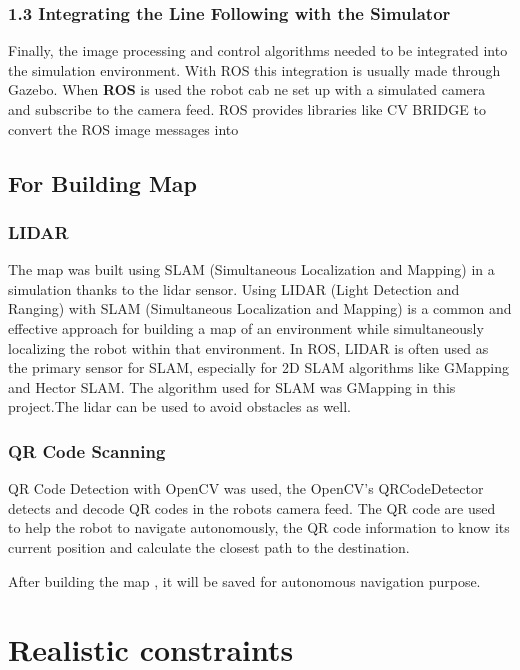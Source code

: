 \documentclass[../../main]{subfiles}
\begin{document}
    \subsection{1.3 Integrating the Line Following with the Simulator}
    
    Finally, the image processing and control algorithms needed to be
    integrated into the simulation environment. With ROS this integration is
    usually made through Gazebo. When \textbf{ROS} is used the robot cab ne
    set up with a simulated camera and subscribe to the camera feed. ROS
    provides libraries like CV BRIDGE to convert the ROS image messages into
    
    \section{For Building Map}
    
    \subsection{LIDAR}
    
    The map was built using SLAM (Simultaneous Localization and Mapping) in
    a simulation thanks to the lidar sensor. Using LIDAR (Light Detection
    and Ranging) with SLAM (Simultaneous Localization and Mapping) is a
    common and effective approach for building a map of an environment while
    simultaneously localizing the robot within that environment. In ROS,
    LIDAR is often used as the primary sensor for SLAM, especially for 2D
    SLAM algorithms like GMapping and Hector SLAM. The algorithm used for
    SLAM was GMapping in this project.The lidar can be used to avoid
    obstacles as well.
    
    \subsection{QR Code Scanning}
    
    QR Code Detection with OpenCV was used, the OpenCV's QRCodeDetector
    detects and decode QR codes in the robot\textquotesingle s camera feed.
    The QR code are used to help the robot to navigate autonomously, the QR
    code information to know its current position and calculate the closest
    path to the destination.
    
    After building the map , it will be saved for autonomous navigation
    purpose.
    
      \chapter{Realistic constraints}
    
\end{document}
